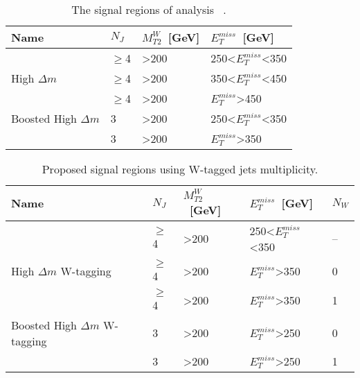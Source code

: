 \begin{table}[h]
\begin{center}
\begin{tabular}{|l|l|l|l|}
\hline
Name            & $N_{J}$  & $M_{T2}^{W}$~[GeV] & $E_{T}^{miss}$~[GeV]  \\
\hline
\hline
                & $\geq$4  & >200                & 250<$E_{T}^{miss}$<350   \\
High $\Delta m$ & $\geq$4  & >200                & 350<$E_{T}^{miss}$<450   \\
                & $\geq$4  & >200                & $E_{T}^{miss}$>450   \\
\hline
Boosted High $\Delta m$ & 3  & >200                & 250<$E_{T}^{miss}$<350   \\
                        & 3  & >200                & $E_{T}^{miss}$>350   \\
\hline
\end{tabular}
\caption[Table caption text]{ The signal regions of analysis~\cite{Sirunyan:2016jpr} . }
\label{tab:SRnoW}
\end{center}
\end{table}

\begin{table}[h]
\begin{center}
\begin{tabular}{|l|l|l|l|l|}
\hline
Name            & $N_{J}$  & $M_{T2}^{W}$~[GeV]            & $E_{T}^{miss}$~[GeV]    & $N_{W}$ \\
\hline
\hline
                          & $\geq$4  & >200                & 250<$E_{T}^{miss}$<350   & --   \\
High $\Delta m$ W-tagging & $\geq$4  & >200                & $E_{T}^{miss}$>350       & 0    \\
                          & $\geq$4  & >200                & $E_{T}^{miss}$>350       & 1    \\
\hline
Boosted High $\Delta m$ W-tagging & 3  & >200              & $E_{T}^{miss}$>250 & 0  \\
                                  & 3  & >200              & $E_{T}^{miss}$>250 & 1  \\
\hline
\end{tabular}
\caption[Table caption text]{ Proposed signal regions using W-tagged jets multiplicity. }
\label{tab:SRW}
\end{center}
\end{table}


